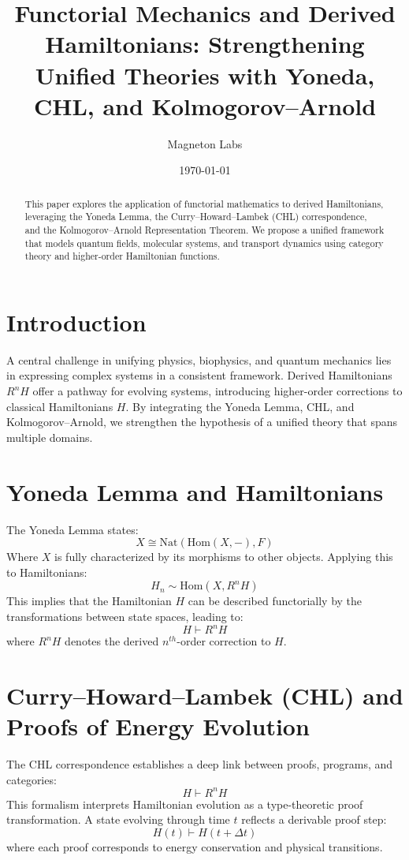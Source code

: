 \documentclass{article}
\title{Functorial Mechanics and Derived Hamiltonians: Strengthening Unified Theories with Yoneda, CHL, and Kolmogorov–Arnold}
\author{Magneton Labs}
\date{\today}
\begin{document}
\maketitle

\begin{abstract}
This paper explores the application of functorial mathematics to derived Hamiltonians, leveraging the Yoneda Lemma, the Curry–Howard–Lambek (CHL) correspondence, and the Kolmogorov–Arnold Representation Theorem. We propose a unified framework that models quantum fields, molecular systems, and transport dynamics using category theory and higher-order Hamiltonian functions. 
\end{abstract}

\section{Introduction}
A central challenge in unifying physics, biophysics, and quantum mechanics lies in expressing complex systems in a consistent framework. Derived Hamiltonians \( R^nH \) offer a pathway for evolving systems, introducing higher-order corrections to classical Hamiltonians \( H \). By integrating the Yoneda Lemma, CHL, and Kolmogorov–Arnold, we strengthen the hypothesis of a unified theory that spans multiple domains.

\section{Yoneda Lemma and Hamiltonians}
The Yoneda Lemma states:
\[
X \cong \text{Nat}(\text{Hom}(X,-), F)
\]
Where \(X\) is fully characterized by its morphisms to other objects. Applying this to Hamiltonians:
\[
H_n \sim \text{Hom}(X, R^nH)
\]
This implies that the Hamiltonian \( H \) can be described functorially by the transformations between state spaces, leading to:
\[
H \vdash R^nH
\]
where \( R^nH \) denotes the derived \( n^{th} \)-order correction to \( H \).

\section{Curry–Howard–Lambek (CHL) and Proofs of Energy Evolution}
The CHL correspondence establishes a deep link between proofs, programs, and categories:
\[
H \vdash R^nH
\]
This formalism interprets Hamiltonian evolution as a type-theoretic proof transformation. A state evolving through time \( t \) reflects a derivable proof step:
\[
H(t) \vdash H(t + \Delta t)
\]
where each proof corresponds to energy conservation and physical transitions.
\end{document}
